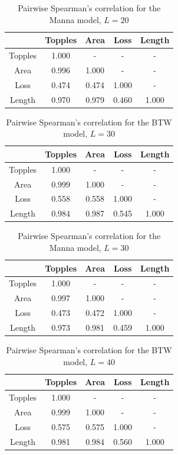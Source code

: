 \begin{table}[htbp]
    \centering
    \begin{tabular}{ccccc}\toprule
         &  Topples&  Area&  Loss& Length\\\midrule
         Topples&  1.000&  -&  -& -\\
         Area&  0.996&  1.000&  -& -\\
         Loss&  0.474&  0.474&  1.000& -\\
         Length&  0.970&  0.979&  0.460& 1.000\\ \bottomrule
    \end{tabular}
    \caption{Pairwise Spearman's correlation for the Manna model, $L=20$}
    \label{tab:corrManna20}
\end{table}

\begin{table}[htbp]
    \centering
    \begin{tabular}{ccccc}\toprule
         &  Topples&  Area&  Loss& Length\\\midrule
         Topples&  1.000&  -&  -& -\\
         Area&  0.999&  1.000&  -& -\\
         Loss&  0.558&  0.558&  1.000& -\\
         Length&  0.984&  0.987&  0.545& 1.000\\ \bottomrule
    \end{tabular}
    \caption{Pairwise Spearman's correlation for the BTW model, $L=30$}
    \label{tab:corrBTW30}
\end{table}

\begin{table}[htbp]
    \centering
    \begin{tabular}{ccccc}\toprule
         &  Topples&  Area&  Loss& Length\\\midrule
         Topples&  1.000&  -&  -& -\\
         Area&  0.997&  1.000&  -& -\\
         Loss&  0.473&  0.472&  1.000& -\\
         Length&  0.973&  0.981&  0.459& 1.000\\ \bottomrule
    \end{tabular}
    \caption{Pairwise Spearman's correlation for the Manna model, $L=30$}
    \label{tab:corrManna30}
\end{table}

\begin{table}[htbp]
    \centering
    \begin{tabular}{ccccc}\toprule
         &  Topples&  Area&  Loss& Length\\\midrule
         Topples&  1.000&  -&  -& -\\
         Area&  0.999&  1.000&  -& -\\
         Loss&  0.575&  0.575&  1.000& -\\
         Length&  0.981&  0.984&  0.560& 1.000\\ \bottomrule
    \end{tabular}
    \caption{Pairwise Spearman's correlation for the BTW model, $L=40$}
    \label{tab:corrBTW40}
\end{table}

